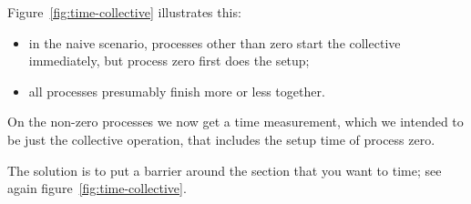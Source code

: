 Figure~\ref{fig:time-collective} illustrates this:
\begin{itemize}
\item in the naive scenario, processes other than zero start the collective immediately,
  but process zero first does the setup;
\item all processes presumably finish more or less together.
\end{itemize}
On the non-zero processes we now get a time measurement,
which we intended to be just the collective operation,
that includes the setup time of process zero.

The solution is to put a barrier around the section that you want to time;
see again figure~\ref{fig:time-collective}.


